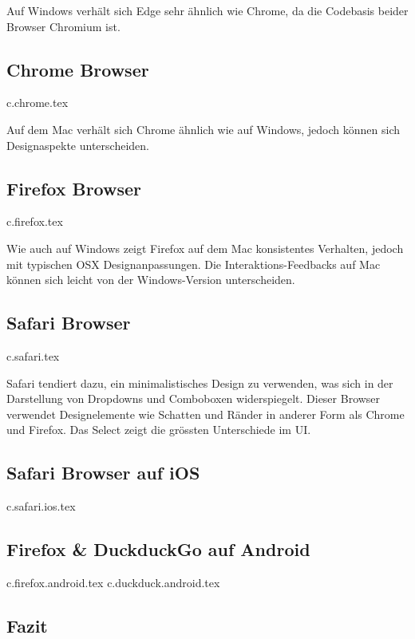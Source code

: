 Auf Windows verhält sich Edge sehr ähnlich wie Chrome, da die Codebasis beider Browser Chromium ist.


\clearpage
\subsection{Chrome Browser}
{c.chrome.tex}

Auf dem Mac verhält sich Chrome ähnlich wie auf Windows, jedoch können sich Designaspekte unterscheiden. 


\clearpage
\subsection{Firefox Browser}
{c.firefox.tex}

Wie auch auf Windows zeigt Firefox auf dem Mac konsistentes Verhalten, jedoch mit typischen OSX Designanpassungen. 
Die Interaktions-Feedbacks auf Mac können sich leicht von der Windows-Version unterscheiden.


\clearpage
\subsection{Safari Browser}
{c.safari.tex}

Safari tendiert dazu, ein minimalistisches Design zu verwenden, was sich in der Darstellung von Dropdowns und Comboboxen widerspiegelt.
Dieser Browser verwendet Designelemente wie Schatten und Ränder in anderer Form als Chrome und Firefox.
Das Select zeigt die grössten Unterschiede im UI.


\clearpage
\subsection{Safari Browser auf iOS}
{c.safari.ios.tex}



\clearpage
\subsection{Firefox \& DuckduckGo auf Android}

{c.firefox.android.tex}
{c.duckduck.android.tex}



\clearpage
\subsection{Fazit}

